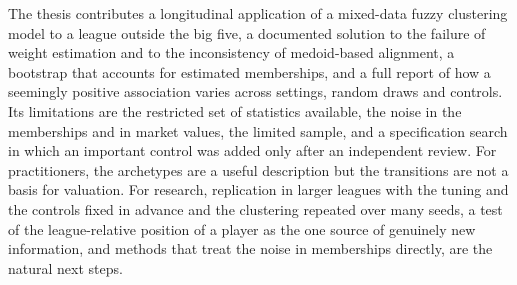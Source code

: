 The thesis contributes a longitudinal application of a mixed-data fuzzy clustering model to a league outside the big five, a documented solution to the failure of weight estimation and to the inconsistency of medoid-based alignment, a bootstrap that accounts for estimated memberships, and a full report of how a seemingly positive association varies across settings, random draws and controls. Its limitations are the restricted set of statistics available, the noise in the memberships and in market values, the limited sample, and a specification search in which an important control was added only after an independent review. For practitioners, the archetypes are a useful description but the transitions are not a basis for valuation. For research, replication in larger leagues with the tuning and the controls fixed in advance and the clustering repeated over many seeds, a test of the league-relative position of a player as the one source of genuinely new information, and methods that treat the noise in memberships directly, are the natural next steps.
